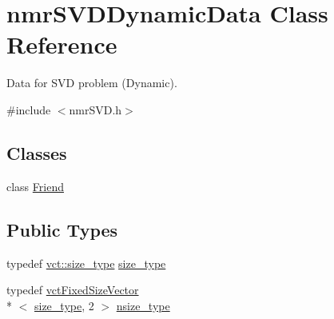 \hypertarget{classnmr_s_v_d_dynamic_data}{\section{nmr\-S\-V\-D\-Dynamic\-Data Class Reference}
\label{classnmr_s_v_d_dynamic_data}
}


Data for S\-V\-D problem (Dynamic).  




{\ttfamily \#include $<$nmr\-S\-V\-D.\-h$>$}

\subsection*{Classes}
\begin{DoxyCompactItemize}
\item 
class \hyperlink{classnmr_s_v_d_dynamic_data_1_1_friend}{Friend}
\end{DoxyCompactItemize}
\subsection*{Public Types}
\begin{DoxyCompactItemize}
\item 
typedef \hyperlink{namespacevct_a3e2935e13aac4500965e00d30565775b}{vct\-::size\-\_\-type} \hyperlink{classnmr_s_v_d_dynamic_data_ae1d183124f1fe39da05af9cea168101d}{size\-\_\-type}
\item 
typedef \hyperlink{classvct_fixed_size_vector}{vct\-Fixed\-Size\-Vector}\\*
$<$ \hyperlink{classnmr_s_v_d_dynamic_data_ae1d183124f1fe39da05af9cea168101d}{size\-\_\-type}, 2 $>$ \hyperlink{classnmr_s_v_d_dynamic_data_a3673bb17448a97213388b41ce36ef5b0}{nsize\-\_\-type}
\end{DoxyCompactItemize}
